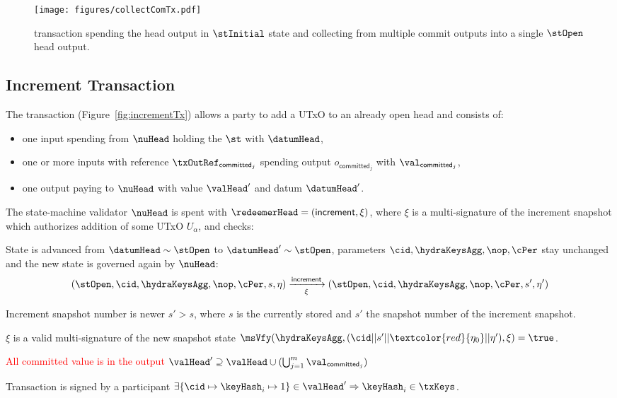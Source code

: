 \begin{figure}[h]
	\centering
	\texttt{[image: figures/collectComTx.pdf]}
	\caption{\mtxCCom{} transaction spending the head output in $\stInitial$
		state and collecting from multiple commit outputs into a single
		$\stOpen$ head output.}\label{fig:collectComTx}
\end{figure}

\subsection{Increment Transaction}\label{sec:increment-tx}

\noindent The \mtxIncrement{} transaction (Figure~\ref{fig:incrementTx}) allows
a party to add a UTxO to an already open head and consists of:

\begin{itemize}
	\item one input spending from $\nuHead$ holding the $\st$ with $\datumHead$,
	\item one or more inputs with reference $\txOutRef_{\mathsf{committed}_{j}}$
	      spending output $o_{\mathsf{committed}_{j}}$ with
	      $\val_{\mathsf{committed}_{j}}$,
	\item one output paying to $\nuHead$ with value $\valHead'$ and
	      datum $\datumHead'$.
\end{itemize}

\noindent The state-machine validator $\nuHead$ is spent with
$\redeemerHead = (\mathsf{increment}, \xi)$, where $\xi$ is a multi-signature of
the increment snapshot which authorizes addition of some UTxO $U_\alpha$, and checks:
\begin{menumerate}
	\item State is advanced from $\datumHead \sim \stOpen$ to
	$\datumHead' \sim \stOpen$, parameters $\cid,\hydraKeysAgg,\nop,\cPer$
	stay unchanged and the new state is governed again by $\nuHead$:
	\[
		(\stOpen,\cid,\hydraKeysAgg,\nop,\cPer,s,\eta) \xrightarrow[\xi]{\mathsf{increment}} (\stOpen,\cid,\hydraKeysAgg,\nop,\cPer,s', \eta')
	\]
	\item Increment snapshot number is newer $s' > s$, where $s$ is the
	currently stored and $s'$ the snapshot number of the increment snapshot.
	\item $\xi$ is a valid multi-signature of the new snapshot state
	$\msVfy(\hydraKeysAgg,(\cid || s' || \textcolor{red}{\eta_{0}} || \eta'),\xi) = \true$. 
	\item {} \textcolor{red}{All committed value is in the output
		$\valHead' \supseteq \valHead \cup (\bigcup_{j=1}^{m} \val_{\mathsf{committed}_{j}})$}

	\item Transaction is signed by a participant $\exists \{\cid \mapsto \keyHash_{i} \mapsto 1\} \in \valHead' \Rightarrow \keyHash_{i} \in \txKeys$.
\end{menumerate}

